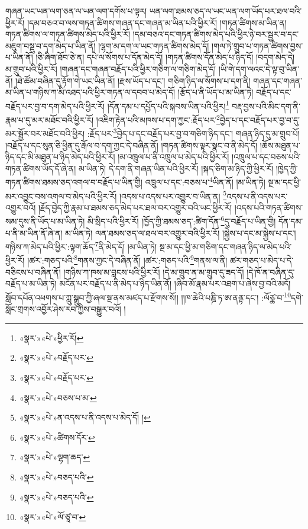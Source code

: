 གཞན་ཡང་ཡན་ལག་ཅན་ལ་ཡན་ལག་དགོས་པ་ལྟར། ཡན་ལག་ཐམས་ཅད་ལ་ཡང་ཡན་ལག་ཡོད་པར་ཐལ་བའི་ཕྱིར་རོ། །དམ་བཅའ་བ་ལས་གཏན་ཚིགས་གཞན་དང་གཞན་མ་ཡིན་པའི་ཕྱིར་རོ། །གཏན་ཚིགས་མ་ཡིན་ན། གཏན་ཚིགས་ལ་གཏན་ཚིགས་མེད་པའི་ཕྱིར་རོ། །དམ་བཅའ་དང་གཏན་ཚིགས་མེད་པའི་ཕྱིར་ཉེ་བར་སྦྱར་བ་དང་མཇུག་བསྡུ་བ་དག་མེད་པ་ཡིན་ནོ། །ལྷག་མ་དག་ལ་ཡང་གཏན་ཚིགས་མེད་དོ། །གལ་ཏེ་གྲུབ་པ་གཏན་ཚིགས་བྱས་པ་ཡིན་ནོ། །ཅི་ཞིག་ཐོབ་ཅེ་ན། དཔེ་ལ་སོགས་པ་དོན་མེད་དོ། །གཏན་ཚིགས་དོན་མེད་པ་ཉིད་དོ། །བདག་མེད་དེ། མ་གྲུབ་པའི་ཕྱིར་རོ། །གཞན་དང་གཞན་བརྗོད་པའི་ཕྱིར་གཅིག་ལ་གཅིག་མེད་དོ། །ཡི་གེ་དག་ལའང་དེ་ལྟ་བུ་ཡིན་ནོ། །ཐེ་ཚོམ་བཞིན་དུ་རྟོག་གེ་ཡང་ཡིན་ནོ། །རྫས་ཡོད་པ་དང་། གཅིག་ཉིད་ལ་སོགས་པ་དག་ནི། གཞན་དང་གཞན་མ་ཡིན་པ་གཉིས་ཀ་མི་འཐད་པའི་ཕྱིར་གཏན་ལ་དབབ་པ་མེད་དོ། །རྩོད་པ་ནི་ཡོད་པ་མ་ཡིན་ཏེ། བརྗོད་པ་དང་བརྗོད་པར་བྱ་བ་དག་མེད་པའི་ཕྱིར་རོ། །དོན་དམ་པ་དཔྱོད་པའི་སྐབས་ཡིན་པའི་ཕྱིར།\footnote{«སྣར་»«པེ་»ཕྱིར་རོ།} བརྡ་བྱས་པའི་མིང་དག་ནི་རྣམ་པ་དུ་མར་མཐོང་བའི་ཕྱིར་རོ། །འཇིག་རྟེན་པའི་མཁས་པ་དག་ཀྱང་:རྗོད་པར་\footnote{«སྣར་»«པེ་»བརྗོད་པར་}བྱེད་པ་དང་བརྗོད་པར་བྱ་བ་དུ་མར་སྦྱོར་བར་མཐོང་བའི་ཕྱིར། :རྗོད་པར་\footnote{«སྣར་»«པེ་»བརྗོད་པར་}བྱེད་པ་དང་བརྗོད་པར་བྱ་བ་གཅིག་ཉིད་དང་། གཞན་ཉིད་དུ་མ་གྲུབ་པོ། །བརྗོད་པ་དང་སུན་ཅི་ཕྱིན་དུ་རྒོལ་བ་དག་ཀྱང་དེ་བཞིན་ནོ། །གཏན་ཚིགས་ལྟར་སྣང་བ་ནི་མེད་དོ། །ཆོས་མཐུན་པ་ཉིད་དང་མི་མཐུན་པ་ཉིད་མེད་པའི་ཕྱིར་རོ། །མ་འཁྲུལ་པ་ནི་འཁྲུལ་པ་མེད་པའི་ཕྱིར་རོ། །འཁྲུལ་པ་དང་བཅས་པའི་གཏན་ཚིགས་ཡོད་དོ་ཞེ་ན། མ་ཡིན་ཏེ། དེ་དག་ནི་གཞན་ཡིན་པའི་ཕྱིར་རོ། །སྐད་ཅིག་མ་ཉིད་ཀྱི་ཕྱིར་རོ། །ཁྱེད་ཀྱི་གཏན་ཚིགས་ཐམས་ཅད་འགལ་བ་བརྗོད་པ་ཡིན་གྱི། འཁྲུལ་པ་དང་:བཅས་པ་\footnote{«སྣར་»«པེ་»བཅས་པ་མ་}ཡིན་ནོ། །མ་ཡིན་ཏེ། སྔ་མ་དང་ཕྱི་མར་འབྱུང་བས་འགལ་བ་མེད་པའི་ཕྱིར་རོ། །འདས་པ་འདས་པར་འགྱུར་བ་ཡིན་ན། \footnote{«སྣར་»«པེ་»ན་འདས་པ་ནི་འདས་པ་མེད་དོ། ། }འདས་པ་ནི་འདས་པར་འགྱུར་བའོ། །རྗོད་བྱེད་ཀྱི་རྣམ་པ་ཐམས་ཅད་མེད་པར་ཐལ་བར་འགྱུར་བའི་ཡང་ཕྱིར་རོ། །འདས་པའི་གཏན་ཚིགས་སམ་དུས་ནི་ཡོད་པ་མ་ཡིན་ཏེ། མི་སྲིད་པའི་ཕྱིར་རོ། །ཁྱོད་ཀྱི་ཐམས་ཅད་:ཚིག་དོན་\footnote{«སྣར་»«པེ་»ཚིགས་དོར་}དུ་བརྗོད་པ་ཡིན་གྱི། དོན་དམ་པ་ནི་མ་ཡིན་ནོ་ཞེ་ན། མ་ཡིན་ཏེ། ལན་ཐམས་ཅད་ལ་ཐལ་བར་འགྱུར་བའི་ཕྱིར་རོ། །སྐྱེས་པ་དང་མ་སྐྱེས་པ་དང་། གཉིས་ཀ་མེད་པའི་ཕྱིར་:ལྟག་ཆོད་\footnote{«སྣར་»«པེ་»ལྷག་ཆད་}ནི་མེད་དོ། །མ་ཡིན་ཏེ། སྔ་མ་དང་ཕྱི་མ་གཅིག་དང་གཞན་ཉིད་ལ་མེད་པའི་ཕྱིར་རོ། །ཚར་:གཅད་པའི་\footnote{«སྣར་»«པེ་»བཅད་པའི་}གནས་ཀྱང་དེ་བཞིན་ནོ། །ཚར་:གཅད་པའི་\footnote{«སྣར་»«པེ་»བཅད་པའི་}གནས་ལ་ནི། ཚར་གཅད་པ་མེད་པ་དེ་བཅིངས་པ་བཞིན་ནོ། །གཉིས་ཀ་ཁས་མ་བླངས་པའི་ཕྱིར་རོ། །དེ་མ་གྲུབ་ན་མ་གྲུབ་དུ་ཟད་དོ། །དེ་ཁོ་ན་བཞིན་དུ་བརྗོད་པ་མ་ཡིན་ཏེ། མངོན་པར་བརྗོད་པ་ནི་མེད་པ་ཉིད་ཡིན་ནོ། །ཞིབ་མོ་རྣམ་པར་འཐག་པ་ཞེས་བྱ་བའི་མདོ། སློབ་དཔོན་འཕགས་པ་ཀླུ་སྒྲུབ་ཀྱི་ཞལ་སྔ་ནས་མཛད་པ་རྫོགས་སོ།། །།ཁ་ཆེའི་པཎྜི་ཏ་ཨ་ནནྟ་དང་། :ལོཙྪ་བ་\footnote{«སྣར་»«པེ་»ལོ་ཙཱ་བ་}དགེ་སློང་གྲགས་འབྱོར་ཤེས་རབ་ཀྱིས་བསྒྱུར་བའོ། ། 
